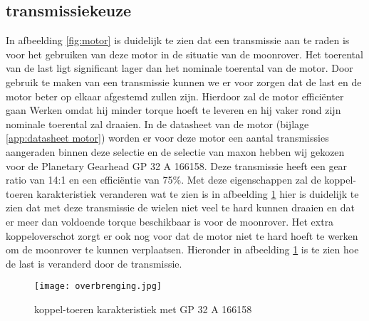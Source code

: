 \newpage

\subsection{transmissiekeuze}
In afbeelding \ref{fig:motor} is duidelijk te zien dat een transmissie aan te raden is voor het gebruiken van deze motor in de situatie van de moonrover. Het toerental van de last ligt significant lager dan het nominale toerental van de motor. Door gebruik te maken van een transmissie kunnen we er voor zorgen dat de last en de motor beter op elkaar afgestemd zullen zijn. Hierdoor zal de motor efficiënter gaan Werken omdat hij minder torque hoeft te leveren en hij vaker rond zijn nominale toerental zal draaien. In de datasheet van de  motor (bijlage \ref{app:datasheet motor}) worden er voor deze motor een aantal transmissies aangeraden binnen deze selectie en de selectie van maxon hebben wij gekozen voor de Planetary Gearhead GP 32 A 166158. Deze transmissie heeft een gear ratio van 14:1 en een efficiëntie van 75\%. Met deze eigenschappen zal de koppel-toeren karakteristiek veranderen wat te zien is in afbeelding \ref{fig:GP 32 A 166158} hier is duidelijk te zien dat met deze transmissie de wielen niet veel te hard kunnen draaien en dat er meer dan voldoende torque beschikbaar is voor de moonrover. Het extra koppeloverschot zorgt er ook nog voor dat de motor niet te hard hoeft te werken om de moonrover te kunnen verplaatsen. Hieronder in afbeelding \ref{fig:GP 32 A 166158} is te zien hoe de last is veranderd door de transmissie.

        \begin{figure}[H]
                \centering
                \texttt{[image: overbrenging.jpg]}
                \caption{koppel-toeren karakteristiek met GP 32 A 166158}
                \label{fig:GP 32 A 166158}
        \end{figure}

